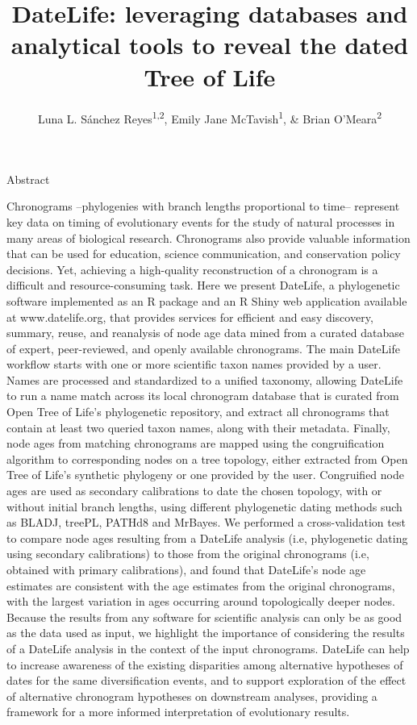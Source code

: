 \documentclass[english,man]{apa6}
\title{DateLife: leveraging databases and analytical tools to reveal the dated Tree of Life}
\author{Luna L. Sánchez Reyes\textsuperscript{1,2}, Emily Jane McTavish\textsuperscript{1}, \& Brian O'Meara\textsuperscript{2}}
\date{}
\affiliation{\vspace{0.5cm}\textsuperscript{1} University of California, Merced, USA\\\textsuperscript{2} University of Tennessee, Knoxville, USA}
\begin{document}
\maketitle

\begin{center}
Abstract
\end{center}

Chronograms --phylogenies with branch lengths proportional to time-- represent key data on timing of evolutionary events for the study of natural processes in many areas of biological research.
Chronograms also provide valuable information that can be used for education, science communication, and conservation policy decisions.
Yet, achieving a high-quality reconstruction of a chronogram is a difficult and resource-consuming task.
Here we present DateLife, a phylogenetic software implemented as an R package and an R Shiny web application available at www.datelife.org, that provides services for efficient and easy discovery, summary, reuse, and reanalysis of node age data mined from a curated database of expert, peer-reviewed, and openly available chronograms.
The main DateLife workflow starts with one or more scientific taxon names provided by a user. Names are processed and standardized to a unified taxonomy, allowing DateLife to run a name match across its local chronogram database that is curated from Open Tree of Life's phylogenetic repository, and extract all chronograms that contain at least two queried taxon names, along with their metadata.
Finally, node ages from matching chronograms are mapped using the congruification algorithm to corresponding nodes on a tree topology, either extracted from Open Tree of Life's synthetic phylogeny or one provided by the user. Congruified node ages are used as secondary calibrations to date the chosen topology, with or without initial branch lengths, using different phylogenetic dating methods such as BLADJ, treePL, PATHd8 and MrBayes.
We performed a cross-validation test to compare node ages resulting from a DateLife analysis (i.e, phylogenetic dating using secondary calibrations) to those from the original chronograms (i.e, obtained with primary calibrations), and found that DateLife's node age estimates are consistent with the age estimates from the original chronograms, with the largest variation in ages occurring around topologically deeper nodes.
Because the results from any software for scientific analysis can only be as good as the data used as input, we highlight the importance of considering the results of a DateLife analysis in the context of the input chronograms.
DateLife can help to increase awareness of the existing disparities among alternative hypotheses of dates for the same diversification events, and to support exploration of the effect of alternative chronogram hypotheses on downstream analyses, providing a framework for a more informed interpretation of evolutionary results.
\end{document}
